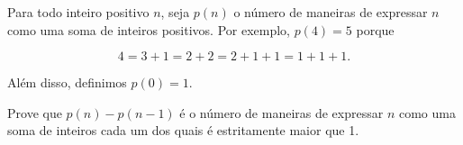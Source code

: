 Para todo inteiro positivo \(n\), seja \(p(n)\) o número de maneiras de expressar \(n\) como uma soma de inteiros positivos. Por exemplo, \(p(4)=5\) porque

\[4=3+1=2+2=2+1+1=1+1+1.\]

Além disso, definimos \(p(0)=1\).

Prove que \(p(n)-p(n-1)\) é o número de maneiras de expressar \(n\) como uma soma de inteiros cada um dos quais é estritamente maior que 1.
